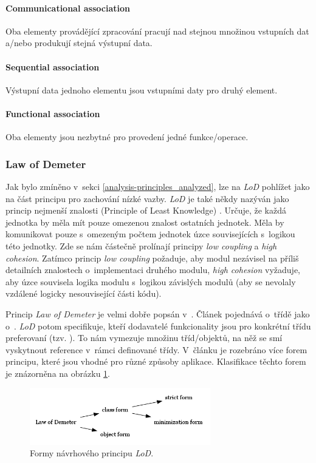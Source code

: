 \paragraph{Communicational association} Oba elementy provádějící zpracování pracují nad stejnou množinou vstupních dat a/nebo produkují stejná výstupní data.

\paragraph{Sequential association} Výstupní data jednoho elementu jsou vstupními daty pro druhý element.

\paragraph{Functional association} Oba elementy jsou nezbytné pro provedení jedné funkce/operace.

\subsubsection{Law of Demeter}
Jak bylo zmíněno v~sekci \ref{analysis-principles_analyzed}, lze na \emph{LoD} pohlížet jako na část principu pro zachování nízké vazby. \emph{LoD} je také někdy nazýván jako princip nejmenší znalosti (Principle of Least Knowledge) \cite{wiki:lod}. Určuje, že každá jednotka by měla mít pouze omezenou znalost ostatních jednotek. Měla by komunikovat pouze s~omezeným počtem jednotek úzce souvisejících s~logikou této jednotky. Zde se nám částečně prolínají principy \emph{low coupling} a \emph{high cohesion}. Zatímco princip \emph{low coupling} požaduje, aby modul nezávisel na příliš detailních znalostech o~implementaci druhého modulu, \emph{high cohesion} vyžaduje, aby úzce souvisela logika modulu s~logikou závislých modulů (aby se nevolaly vzdálené logicky nesouvisející části kódu).

Princip \emph{Law of Demeter} je velmi dobře popsán v~\cite{35588}. Článek pojednává o~třídě jako o~. \emph{LoD} potom specifikuje, kteří dodavatelé funkcionality jsou pro konkrétní třídu preferovaní (tzv. ). To nám vymezuje množinu tříd/objektů, na něž se smí vyskytnout reference v~rámci definované třídy. V~článku je rozebráno více forem principu, které jsou vhodné pro různé způsoby aplikace. Klasifikace těchto forem je znázorněna na obrázku \ref{demeter_law_types}.

\begin{figure}[h!]
  \centering
  \includegraphics[width=0.7\textwidth]{./graphs/demeter_law_types.png}
  \caption{Formy návrhového principu \emph{LoD}.\label{demeter_law_types}}
\end{figure}


